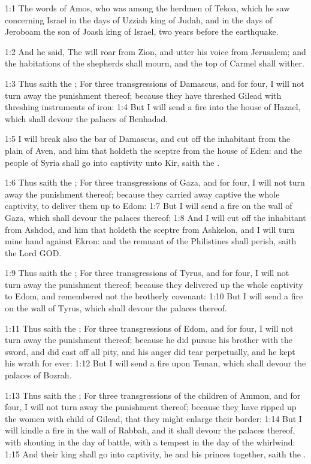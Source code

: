 

1:1 The words of Amos, who was among the herdmen of Tekoa, which he
saw concerning Israel in the days of Uzziah king of Judah, and in the
days of Jeroboam the son of Joash king of Israel, two years before the
earthquake.

1:2 And he said, The \LORD will roar from Zion, and utter his voice
from Jerusalem; and the habitations of the shepherds shall mourn, and
the top of Carmel shall wither.

1:3 Thus saith the \LORD; For three transgressions of Damascus, and for
four, I will not turn away the punishment thereof; because they have
threshed Gilead with threshing instruments of iron: 1:4 But I will
send a fire into the house of Hazael, which shall devour the palaces
of Benhadad.

1:5 I will break also the bar of Damascus, and cut off the inhabitant
from the plain of Aven, and him that holdeth the sceptre from the
house of Eden: and the people of Syria shall go into captivity unto
Kir, saith the \LORD.

1:6 Thus saith the \LORD; For three transgressions of Gaza, and for
four, I will not turn away the punishment thereof; because they
carried away captive the whole captivity, to deliver them up to Edom:
1:7 But I will send a fire on the wall of Gaza, which shall devour the
palaces thereof: 1:8 And I will cut off the inhabitant from Ashdod,
and him that holdeth the sceptre from Ashkelon, and I will turn mine
hand against Ekron: and the remnant of the Philistines shall perish,
saith the Lord GOD.

1:9 Thus saith the \LORD; For three transgressions of Tyrus, and for
four, I will not turn away the punishment thereof; because they
delivered up the whole captivity to Edom, and remembered not the
brotherly covenant: 1:10 But I will send a fire on the wall of Tyrus,
which shall devour the palaces thereof.

1:11 Thus saith the \LORD; For three transgressions of Edom, and for
four, I will not turn away the punishment thereof; because he did
pursue his brother with the sword, and did cast off all pity, and his
anger did tear perpetually, and he kept his wrath for ever: 1:12 But I
will send a fire upon Teman, which shall devour the palaces of Bozrah.

1:13 Thus saith the \LORD; For three transgressions of the children of
Ammon, and for four, I will not turn away the punishment thereof;
because they have ripped up the women with child of Gilead, that they
might enlarge their border: 1:14 But I will kindle a fire in the wall
of Rabbah, and it shall devour the palaces thereof, with shouting in
the day of battle, with a tempest in the day of the whirlwind: 1:15
And their king shall go into captivity, he and his princes together,
saith the \LORD.


